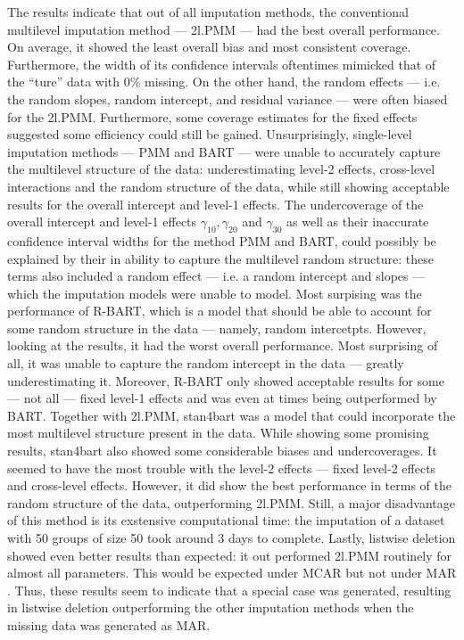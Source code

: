 \documentclass[10pt, a4paper, titlepage]{article}
\begin{document}
The results indicate that out of all imputation methods, the conventional multilevel imputation method --- 2l.PMM --- had the best overall performance. On average, it showed the least overall bias and most consistent coverage. Furthermore, the width of its confidence intervals oftentimes mimicked that of the ``ture'' data with 0\% missing. On the other hand, the random effects --- i.e. the random slopes, random intercept, and residual variance --- were often biased for the 2l.PMM. Furthermore, some coverage estimates for the fixed effects suggested some efficiency could still be gained. Unsurprisingly, single-level imputation methods --- PMM and BART --- were unable to accurately capture the multilevel structure of the data: underestimating level-2 effects, cross-level interactions and the random structure of the data, while still showing acceptable results for the overall intercept and level-1 effects. The undercoverage of the overall intercept and level-1 effects $\gamma_{10}, \gamma_{20}$ and $\gamma_{30}$ as well as their inaccurate confidence interval widths for the method PMM and BART, could possibly be explained by their in ability to capture the multilevel random structure: these terms also included a random effect --- i.e. a random intercept and slopes --- which the imputation models were unable to model. Most surpising was the performance of R-BART, which is a model that should be able to account for some random structure in the data --- namely, random intercetpts. However, looking at the results, it had the worst overall performance. Most surprising of all, it was unable to capture the random intercept in the data --- greatly underestimating it. Moreover, R-BART only showed acceptable results for some --- not all --- fixed level-1 effects and was even at times being outperformed by BART. Together with 2l.PMM, stan4bart was a model that could incorporate the most multilevel structure present in the data. While showing some promising results, stan4bart also showed some considerable biases and undercoverages. It seemed to have the most trouble with the level-2 effects --- fixed level-2 effects and cross-level effects. However, it did show the best performance in terms of the random structure of the data, outperforming 2l.PMM. Still, a major disadvantage of this method is its exstensive computational time: the imputation of a dataset with 50 groups of size 50 took around 3 days to complete. Lastly, listwise deletion showed even better results than expected: it out performed 2l.PMM routinely for almost all parameters. This would be expected under MCAR but not under MAR \citep{buurenFlexibleImputationMissing2018,enders2018a,peeters2015,austin2021,carpenter2013,little2002,grund2018,ludtke2017,grund2021,schouten2021}. Thus, these results seem to indicate that a special case was generated, resulting in listwise deletion outperforming the other imputation methods when the missing data was generated as MAR.
\end{document}
